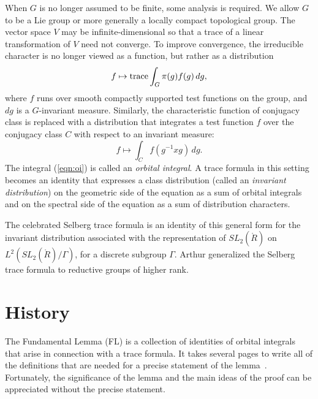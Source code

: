 When $G$ is no longer assumed to be finite, some analysis is
required.  We allow $G$ to be a Lie group or more generally a locally
compact topological group.  The vector space $V$ may be 
infinite-dimensional so that a  trace of a linear
transformation of $V$ need not converge.  To improve convergence,
the irreducible character is no longer viewed as a function, but rather as a
distribution
\[
f \mapsto {\operatorname{trace}} \int_{G} \pi(g) f(g) \, dg,
\]
where $f$ runs over smooth compactly supported test functions on
the group, and $dg$ is a $G$-invariant measure.  Similarly, the
characteristic function of conjugacy class is replaced with a
distribution that integrates a test function $f$ over the
conjugacy class $C$ with respect to an invariant measure:
\begin{equation}\label{eqn:oi}
f \mapsto \int_C f(g^{-1} x g) \, dg.
\end{equation}
The integral (\ref{eqn:oi}) is called an {\it orbital integral}.  A
trace formula in this setting becomes an identity that expresses a
class distribution (called an {\it invariant distribution}) on the
geometric side of the equation as a sum of orbital integrals and on
the spectral side of the equation as a sum of distribution characters.

The celebrated Selberg trace formula is an identity of this general
form for the invariant distribution associated with the representation
of $SL_2(\ring{R})$ on $L^2(SL_2(\ring{R})/\Gamma)$, for a discrete
subgroup $\Gamma$.  Arthur generalized the Selberg trace formula to
reductive groups of higher rank.


\section{History}

The Fundamental Lemma (FL) is a collection of identities of orbital
integrals that arise in connection with a trace formula.  It takes
several pages to write all of the definitions that are needed for a precise
statement of the lemma~\cite{Hales:FL-statement}.  Fortunately, the
significance of the lemma and the main ideas of the proof can be
appreciated without the precise statement.


